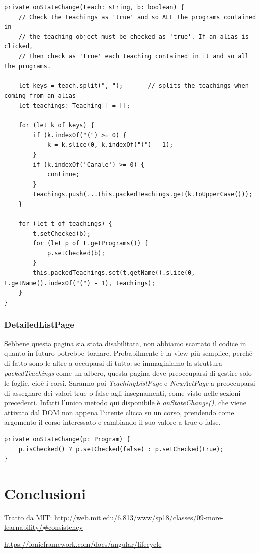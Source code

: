 \documentclass[Lau, oneside, noexaminfo]{sapthesis}%
\begin{document}
\begin{lstlisting}
private onStateChange(teach: string, b: boolean) {
	// Check the teachings as 'true' and so ALL the programs contained in
	// the teaching object must be checked as 'true'. If an alias is clicked,
	// then check as 'true' each teaching contained in it and so all the programs.

	let keys = teach.split(", ");		// splits the teachings when coming from an alias
	let teachings: Teaching[] = [];

	for (let k of keys) {
		if (k.indexOf("(") >= 0) {
			k = k.slice(0, k.indexOf("(") - 1);
		}
		if (k.indexOf('Canale') >= 0) {
			continue;
		}
		teachings.push(...this.packedTeachings.get(k.toUpperCase()));
	}

	for (let t of teachings) {
		t.setChecked(b);
		for (let p of t.getPrograms()) {
			p.setChecked(b);
		}
		this.packedTeachings.set(t.getName().slice(0, t.getName().indexOf("(") - 1), teachings);
	}
}
\end{lstlisting}

\subsection{DetailedListPage}
Sebbene questa pagina sia stata disabilitata, non abbiamo scartato il codice in quanto in futuro potrebbe tornare. Probabilmente è la view più semplice, perché di fatto sono le altre a occuparsi di tutto: se immaginiamo la struttura \textit{packedTeachings} come un albero, questa pagina deve preoccuparsi di gestire solo le foglie, cioè i corsi. Saranno poi \textit{TeachingListPage} e \textit{NewActPage} a preoccuparsi di assegnare dei valori true o false agli insegnamenti, come visto nelle sezioni precedenti. Infatti l'unico metodo qui disponibile è \textit{onStateChange()}, che viene attivato dal DOM non appena l'utente clicca su un corso, prendendo come argomento il corso interessato e cambiando il suo valore a true o false.

\begin{lstlisting}
private onStateChange(p: Program) {
	p.isChecked() ? p.setChecked(false) : p.setChecked(true);
}
\end{lstlisting}

\chapter{Conclusioni}
\label{ch:4}

\backmatter
{}
\begin{thebibliography}{17}

Tratto da MIT:
\url{http://web.mit.edu/6.813/www/sp18/classes/09-more-learnability/#consistency}

\url{https://ionicframework.com/docs/angular/lifecycle}

\end{thebibliography}
\end{document}
